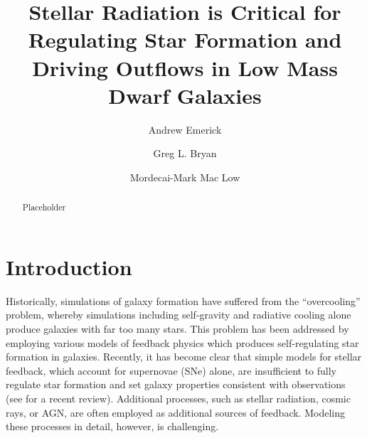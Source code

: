 \documentclass[twocolumn]{aastex62}
\begin{document}
\title{Stellar Radiation is Critical for Regulating Star Formation and Driving Outflows in Low Mass Dwarf Galaxies}


\author{Andrew Emerick}

\author{Greg L. Bryan}

\author{Mordecai-Mark Mac Low}
\nocollaboration

\begin{abstract}
Placeholder
\end{abstract}


\section{Introduction} \label{sec:intro}
Historically, simulations of galaxy formation have suffered from the ``overcooling'' problem, whereby simulations including self-gravity and radiative cooling alone produce galaxies with far too many stars. This problem has been addressed by employing various models of feedback physics which produces self-regulating star formation in galaxies. Recently, it has become clear that simple models for stellar feedback, which account for supernovae (SNe) alone, are insufficient to fully regulate star formation and set galaxy properties consistent with observations (see \cite{NaabOstriker2017} for a recent review). Additional processes, such as stellar radiation, cosmic rays, or AGN, are often employed as additional sources of feedback. Modeling these processes in detail, however, is challenging.
\end{document}
